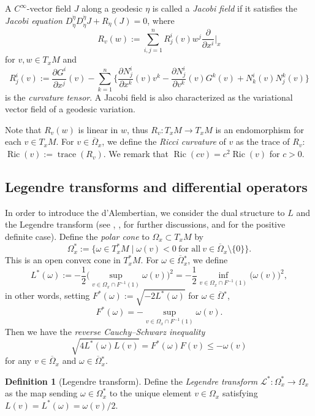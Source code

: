 \documentclass[a4paper,11pt]{article}
\numberwithin{equation}{section}
\theoremstyle{definition}
\newtheorem{definition}{Definition}[section]
\theoremstyle{plain}
\newcommand{\del}{\partial}
\newcommand{\lra}{\longrightarrow}
\newcommand{\LL}{\ensuremath{\mathscr{L}}}
\def\Ric{\mathop{\mathrm{Ric}}\nolimits}
\def\trace{\mathop{\mathrm{trace}}\nolimits}
\newcommand{\ol}[1]{\overline{#1}}
\begin{document}
A $C^{\infty}$-vector field $J$ along a geodesic $\eta$ is called a \emph{Jacobi field}
if it satisfies the \emph{Jacobi equation} $D^{\dot{\eta}}_{\dot{\eta}} D^{\dot{\eta}}_{\dot{\eta}} J +R_{\dot{\eta}}(J) =0$,
where
\[ R_v(w):=\sum_{i,j=1}^n R^i_j(v) w^j \frac{\del}{\del x^i} \bigg|_x \]
for $v,w \in T_xM$ and
\[ R^i_j(v) :=\frac{\del G^i}{\del x^j}(v)
 -\sum_{k=1}^n \bigg\{ \frac{\del N^i_j}{\del x^k}(v) v^k
 -\frac{\del N^i_j}{\del v^k}(v) G^k(v) +N^i_k(v) N^k_j(v) \bigg\} \]
is the \emph{curvature tensor}.
A Jacobi field is also characterized as the variational vector field of a geodesic variation.

Note that $R_v(w)$ is linear in $w$, thus $R_v \colon T_xM \lra T_xM$ is an endomorphism
for each $v \in T_xM$.
For $v \in \overline{\Omega}_x$, we define the \emph{Ricci curvature} of $v$ as the trace of $R_v$: $\Ric(v):=\trace(R_v)$.
We remark that $\Ric(cv)=c^2 \Ric(v)$ for $c>0$.

\subsection{Legendre transforms and differential operators}\label{ssc:Lap}

In order to introduce the d'Alembertian, we consider the dual structure to $L$ and the Legendre transform
(see  \cite{Min-cone}, \cite[\S 3.1]{Min-causality},  \cite[\S 4.4]{LMO2} for further discussions, and  \cite[\S 3.2]{Obook} for the positive definite case).
Define the \emph{polar cone} to $\Omega_x \subset T_xM$ by
\[ \Omega^*_x :=\big\{ \omega \in T_x^*M \mid
 \omega(v)<0\ \text{for all}\ v \in \overline{\Omega}_x \setminus \{0\} \big\}. \]
This is an open convex cone in $T_x^*M$.
For $\omega \in \ol{\Omega}{}^*_x$, we define
\[ L^*(\omega)
 := -\frac{1}{2} \biggl( \sup_{v \in \Omega_x \cap F^{-1}(1)} \omega(v) \biggr)^2
 = -\frac{1}{2} \inf_{v \in \Omega_x \cap F^{-1}(1)} \bigl( \omega(v) \bigr)^2, \]
in other words, setting $F^*(\omega):=\sqrt{-2L^*(\omega)}$ for $\omega \in \ol{\Omega}{}^*$,
\[ F^*(\omega) = -\sup_{v \in \Omega_x \cap F^{-1}(1)} \omega(v). \]
Then we have the \emph{reverse Cauchy--Schwarz inequality}
\begin{equation}\label{eq:rCS}
\sqrt{4L^*(\omega) L(v)} =F^*(\omega)F(v) \le -\omega(v)
\end{equation}
for any $v \in \ol{\Omega}_x$ and $\omega \in \ol{\Omega}{}^*_x$.

\begin{definition}[Legendre transform]\label{df:Leg}
Define the \emph{Legendre transform}
$\LL^* \colon \Omega^*_x \lra \Omega_x$ as the map sending $\omega \in \Omega^*_x$
to the unique element $v \in \Omega_x$ satisfying $L(v)=L^*(\omega)=\omega(v)/2$. 
\end{definition}
\end{document}
